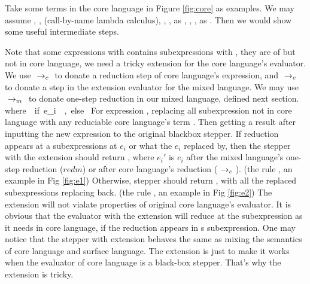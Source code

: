 Take some terms in the core language in Figure \ref{fig:core} as examples.
We may assume , ,  (call-by-name lambda calculus), , ,  as , , \m{$\lambda$},  as . Then we would show some useful intermediate steps.

Note that some expressions with  contains subexpressions with , they are of  but not in core language, we need a tricky extension for the core language's evaluator.
We use $~\rightarrow_c~$ to donate a reduction step of core language's expression, and $~\rightarrow_e~$ to donate a step in the extension evaluator for the mixed language. We may use $~\rightarrow_m~$ to donate one-step reduction in our mixed language, defined next section.
{}
{\\where~~if~e_i~\in~,~else~}
{}
For expression , replacing all subexpression not in core language with any reduciable core language's term . Then getting a result after inputting the new expression  to the original blackbox stepper. If reduction appears at a subexpressions at $e_i$ or what the $e_i$ replaced by, then the stepper with the extension should return , where $e_i'$ is $e_i$ after the mixed language's one-step reduction ($redm{}{}$) or after core language's reduction ($~\rightarrow_c~$). (the rule , an example in Fig \ref{fig:e1}) Otherwise, stepper should return , with all the replaced subexpressions replacing back. (the rule , an example in Fig \ref{fig:e2}) The extension will not vialate properties of original core language's evaluator. It is obvious that the evaluator with the extension will reduce at the subexpression as it needs in core language, if the reduction appears in s subexpression. One may notice that the stepper with extension behaves the same as mixing the semantics of core language and surface language. The extension is just to make it works when the evaluator of core language is a black-box stepper. That's why the extension is tricky.

